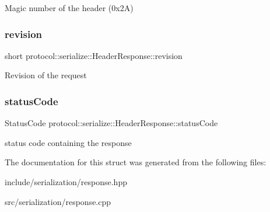 Magic number of the header (0x2A) \mbox{\label{structprotocol_1_1serialize_1_1_header_response_a9dcd816424a4a3c3504c9fbf242c4eaa}} 
\subsubsection{\texorpdfstring{revision}{revision}}
{\footnotesize\ttfamily short protocol\+::serialize\+::\+Header\+Response\+::revision}

Revision of the request \mbox{\label{structprotocol_1_1serialize_1_1_header_response_aee1d562d973f3d653927252e1fe4135d}} 
\subsubsection{\texorpdfstring{status\+Code}{statusCode}}
{\footnotesize\ttfamily Status\+Code protocol\+::serialize\+::\+Header\+Response\+::status\+Code}

status code containing the response 

The documentation for this struct was generated from the following files\+:\begin{DoxyCompactItemize}
\item 
include/serialization/response.\+hpp\item 
src/serialization/response.\+cpp\end{DoxyCompactItemize}
